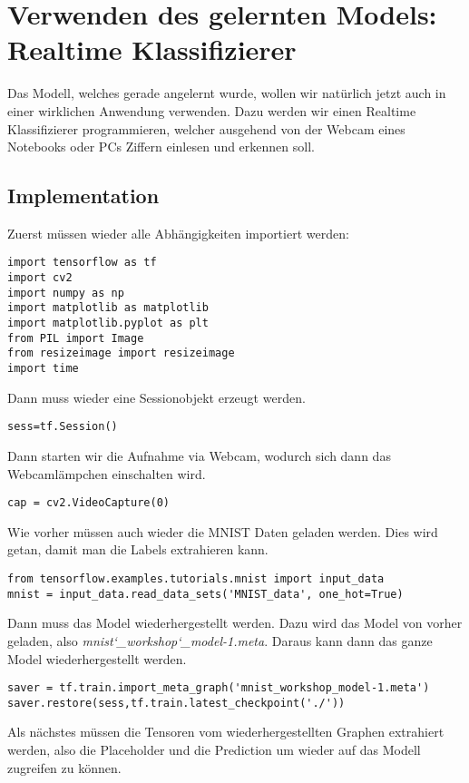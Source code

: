 \chapter{Verwenden des gelernten Models: Realtime Klassifizierer}
Das Modell, welches gerade angelernt wurde, wollen wir natürlich jetzt auch in einer wirklichen Anwendung verwenden. Dazu werden wir einen Realtime Klassifizierer programmieren, welcher ausgehend von der Webcam eines Notebooks oder PCs Ziffern einlesen und erkennen soll.
\section{Implementation}
Zuerst müssen wieder alle Abhängigkeiten importiert werden:
\lstset{language=Python}
\begin{lstlisting}
import tensorflow as tf
import cv2
import numpy as np
import matplotlib as matplotlib
import matplotlib.pyplot as plt
from PIL import Image
from resizeimage import resizeimage
import time
\end{lstlisting}
Dann muss wieder eine Sessionobjekt erzeugt werden.
\begin{lstlisting}
sess=tf.Session()
\end{lstlisting}
Dann starten wir die Aufnahme via Webcam, wodurch sich dann das Webcamlämpchen einschalten wird.
\begin{lstlisting}
cap = cv2.VideoCapture(0)
\end{lstlisting}
Wie vorher müssen auch wieder die MNIST Daten geladen werden. Dies wird getan, damit man die Labels extrahieren kann.
\begin{lstlisting}
from tensorflow.examples.tutorials.mnist import input_data
mnist = input_data.read_data_sets('MNIST_data', one_hot=True)
\end{lstlisting}
Dann muss das Model wiederhergestellt werden. Dazu wird das Model von vorher geladen, also \emph{mnist\char`_workshop\char`_model-1.meta}. Daraus kann dann das ganze Model wiederhergestellt werden.
\begin{lstlisting}
saver = tf.train.import_meta_graph('mnist_workshop_model-1.meta')
saver.restore(sess,tf.train.latest_checkpoint('./'))
\end{lstlisting}
Als nächstes müssen die Tensoren vom wiederhergestellten Graphen extrahiert werden, also die Placeholder und die Prediction um wieder auf das Modell zugreifen zu können.
